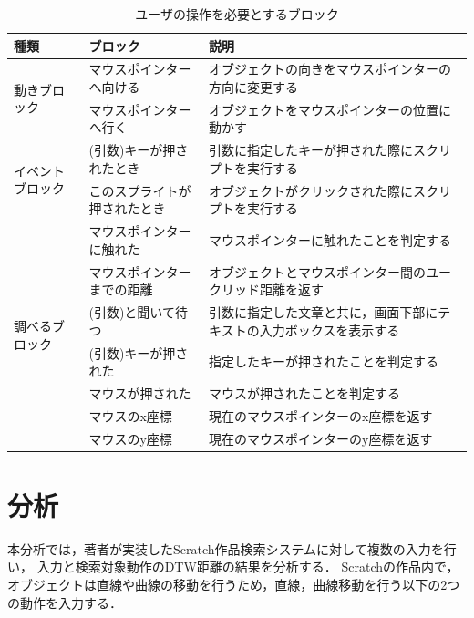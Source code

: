 \documentclass[11pt]{jreport}
\begin{document}
\begin{table}
    \caption{ユーザの操作を必要とするブロック}
    \label{interactionblock}
    \centering
    \begin{tabularx}{\textwidth}{l|l|X}
    \hline
        種類 & ブロック & 説明 \\
        \hline \hline
        \multirow{2}{*}{動きブロック} 
        & マウスポインターへ向ける & オブジェクトの向きをマウスポインターの方向に変更する \\
        \cline{2-3}
        & マウスポインターへ行く & オブジェクトをマウスポインターの位置に動かす \\
        \hline
        \multirow{2}{*}{イベントブロック}
        & (引数)キーが押されたとき & 引数に指定したキーが押された際にスクリプトを実行する \\
        \cline{2-3}
        & このスプライトが押されたとき & オブジェクトがクリックされた際にスクリプトを実行する \\
        \hline
        \multirow{7}{*}{調べるブロック} & マウスポインターに触れた & マウスポインターに触れたことを判定する \\
        \cline{2-3}
        & マウスポインターまでの距離 & オブジェクトとマウスポインター間のユークリッド距離を返す \\
        \cline{2-3}
        & (引数)と聞いて待つ & 引数に指定した文章と共に，画面下部にテキストの入力ボックスを表示する \\
        \cline{2-3}
        & (引数)キーが押された & 指定したキーが押されたことを判定する \\
        \cline{2-3}
        & マウスが押された & マウスが押されたことを判定する \\
        \cline{2-3}
        & マウスのx座標 & 現在のマウスポインターのx座標を返す \\
        \cline{2-3}
        & マウスのy座標 & 現在のマウスポインターのy座標を返す \\
        \hline
    \end{tabularx}
\end{table}

\section{分析}
本分析では，著者が実装したScratch作品検索システムに対して複数の入力を行い，
入力と検索対象動作のDTW距離の結果を分析する．
Scratchの作品内で，オブジェクトは直線や曲線の移動を行うため，直線，曲線移動を行う以下の2つの動作を入力する．
\end{document}
